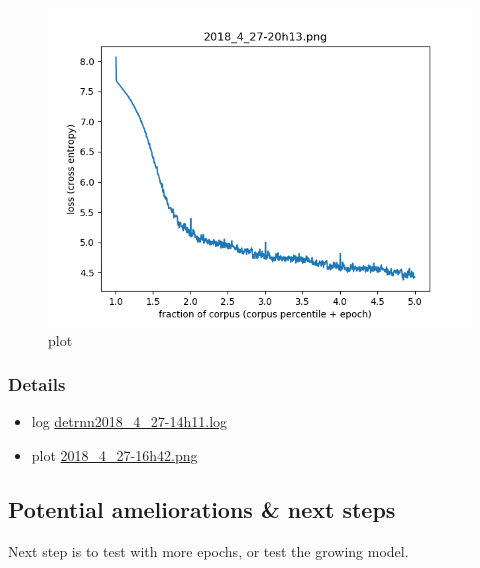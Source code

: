 \begin{figure}[h]
\centering
\includegraphics{parts/appendix/reports-gmsnn/docs_esteban-latex/test_reports/2018_4_27-20h13.png}
\caption{plot}
\end{figure}

\subsubsection{Details}

\begin{itemize}
\item
  log
  \href{https://gitlab.inria.fr/emarquer/awd-lstm-lm/blob/reimplement/logs/detrnn2018_4_27-14h11.log}{detrnn2018\_4\_27-14h11.log}
\item
  plot
  \href{https://gitlab.inria.fr/emarquer/awd-lstm-lm/blob/reimplement/plots/2018_4_27-20h13.png}{2018\_4\_27-16h42.png}
\end{itemize}

\subsection{Potential ameliorations \& next steps}

Next step is to test with more epochs, or test the growing model.
